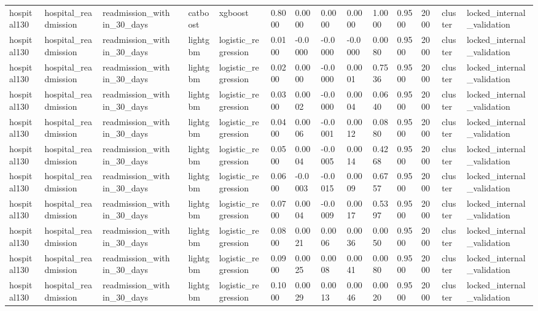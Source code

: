 \begin{tabular}{lllllllllllllll}
hospital130 & hospital\_readmission & readmission\_within\_30\_days &  & catboost & xgboost & 0.8000 & 0.0000 & 0.0000 & 0.0000 & 1.0000 & 0.9500 & 2000 & cluster & locked\_internal\_validation \\
hospital130 & hospital\_readmission & readmission\_within\_30\_days &  & lightgbm & logistic\_regression & 0.0100 & -0.0000 & -0.0000 & -0.0000 & 0.0080 & 0.9500 & 2000 & cluster & locked\_internal\_validation \\
hospital130 & hospital\_readmission & readmission\_within\_30\_days &  & lightgbm & logistic\_regression & 0.0200 & 0.0000 & -0.0000 & 0.0001 & 0.7536 & 0.9500 & 2000 & cluster & locked\_internal\_validation \\
hospital130 & hospital\_readmission & readmission\_within\_30\_days &  & lightgbm & logistic\_regression & 0.0300 & 0.0002 & -0.0000 & 0.0004 & 0.0640 & 0.9500 & 2000 & cluster & locked\_internal\_validation \\
hospital130 & hospital\_readmission & readmission\_within\_30\_days &  & lightgbm & logistic\_regression & 0.0400 & 0.0006 & -0.0001 & 0.0012 & 0.0880 & 0.9500 & 2000 & cluster & locked\_internal\_validation \\
hospital130 & hospital\_readmission & readmission\_within\_30\_days &  & lightgbm & logistic\_regression & 0.0500 & 0.0004 & -0.0005 & 0.0014 & 0.4268 & 0.9500 & 2000 & cluster & locked\_internal\_validation \\
hospital130 & hospital\_readmission & readmission\_within\_30\_days &  & lightgbm & logistic\_regression & 0.0600 & -0.0003 & -0.0015 & 0.0009 & 0.6757 & 0.9500 & 2000 & cluster & locked\_internal\_validation \\
hospital130 & hospital\_readmission & readmission\_within\_30\_days &  & lightgbm & logistic\_regression & 0.0700 & 0.0004 & -0.0009 & 0.0017 & 0.5397 & 0.9500 & 2000 & cluster & locked\_internal\_validation \\
hospital130 & hospital\_readmission & readmission\_within\_30\_days &  & lightgbm & logistic\_regression & 0.0800 & 0.0021 & 0.0006 & 0.0036 & 0.0050 & 0.9500 & 2000 & cluster & locked\_internal\_validation \\
hospital130 & hospital\_readmission & readmission\_within\_30\_days &  & lightgbm & logistic\_regression & 0.0900 & 0.0025 & 0.0008 & 0.0041 & 0.0080 & 0.9500 & 2000 & cluster & locked\_internal\_validation \\
hospital130 & hospital\_readmission & readmission\_within\_30\_days &  & lightgbm & logistic\_regression & 0.1000 & 0.0029 & 0.0013 & 0.0046 & 0.0020 & 0.9500 & 2000 & cluster & locked\_internal\_validation \\

\end{tabular}
